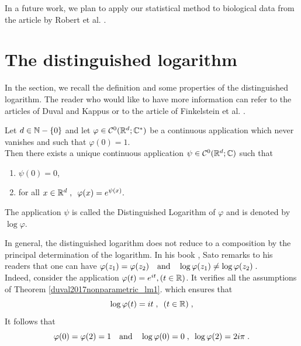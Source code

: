 In a future work, we plan to apply our statistical method to biological data from the article by Robert et al. \cite{robert2018mutation}. \\



\section{The distinguished logarithm}
\label{S:DistingLog}

In the section, we recall the definition and some properties of the distinguished logarithm. The reader who would like to have more information can refer to the articles of Duval and Kappus \cite{duval2017nonparametric, duval2019adaptive} or to the article of Finkelstein et al. \cite{finkelstein1999extinguishing}.

\begin{theorem}
\label{duval2017nonparametric_lm1}
Let $d \in \mathbb{N} - \{0\}$ and let $\varphi \in \mathcal{C}^0(\mathbb{R}^d; \mathbb{C}^*)$ be a continuous application which never vanishes and such that $\varphi(0) = 1$. \\
Then there exists a unique continuous application $\psi\in \mathcal{C}^0(\mathbb{R}^d; \mathbb{C})$ such that
	\begin{enumerate}
	\item $\psi(0) = 0$,  
	\item for all $x \in \mathbb{R}^d \; , \enspace \varphi(x) = e^{\psi(x)}.$
	\end{enumerate}
The application $\psi$ is called the Distinguished Logarithm of $\varphi$ and is denoted by $\log \varphi$.
\end{theorem}

\begin{remark} In general, the distinguished logarithm does not reduce to a composition by the principal determination of the logarithm. In his book \cite{sato1999levy}, Sato remarks to his readers that one can have
    $\varphi(z_1) = \varphi(z_2) \quad \text{and} \quad \log \varphi(z_1) \neq \log \varphi(z_2)
    \; . $ \\
Indeed, consider the application $\varphi(t) = e^{it}, (t \in \mathbb{R})$. It verifies all the assumptions of Theorem \ref{duval2017nonparametric_lm1}.
which ensures that
    \begin{equation*}
        \log \varphi(t) = it 
        \; , \enspace (t \in \mathbb{R})
        \; ,
    \end{equation*}
It follows that
    \begin{equation*}
        \varphi(0) = \varphi(2) = 1 \quad \text{and} \quad \log\varphi(0) = 0 \; , \enspace \log\varphi(2) = 2i \pi
        \; .
    \end{equation*}
\end{remark}

